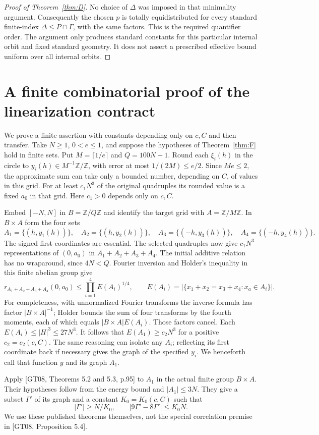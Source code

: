 \documentclass[11pt]{article}
\newcommand{\Z}{\mathbb Z}
\begin{document}
\begin{proof}[Proof of Theorem~\ref{thm:D}]
No choice of $\Delta$ was imposed in that minimality argument. Consequently
the chosen $p$ is totally equidistributed for every standard finite-index
$\Delta\leq P\cap\Gamma$, with the same factors. This is the required
quantifier order. The argument only produces standard constants for this
particular internal orbit and fixed standard geometry. It does not assert
a prescribed effective bound uniform over all internal orbits.
\end{proof}

\section{A finite combinatorial proof of the linearization contract}
We prove a finite assertion with constants depending only on $c,C$ and then
transfer. Take $N\geq1$, $0<e\leq1$, and suppose the hypotheses of
Theorem~\ref{thm:F} hold in finite sets. Put $M=\lceil1/e\rceil$ and
$Q=100N+1$. Round each $\xi_i(h)$ in the circle to $y_i(h)\in M^{-1}\Z/\Z$,
with error at most $1/(2M)\leq e/2$. Since $Me\leq2$, the approximate sum
can take only a bounded number, depending on $C$, of values in this grid.
For at least $c_1N^3$ of the original quadruples its rounded value is a
fixed $a_0$ in that grid. Here $c_1>0$ depends only on $c,C$.

Embed $[-N,N]$ in $B=\Z/Q\Z$ and identify the target grid with $A=\Z/M\Z$.
In $B\times A$ form the four sets
\[
 A_1=\{(h,y_1(h))\},\quad A_2=\{(h,y_2(h))\},\quad
 A_3=\{(-h,y_3(h))\},\quad A_4=\{(-h,y_4(h))\}.             \tag{F1}
\]
The signed first coordinates are essential. The selected quadruples now
give $c_1N^3$ representations of $(0,a_0)$ in $A_1+A_2+A_3+A_4$.
The initial additive relation has no wraparound, since $4N<Q$.
Fourier inversion and Holder's inequality in this finite abelian group give
\[
 r_{A_1+A_2+A_3+A_4}(0,a_0)
          \leq\prod_{i=1}^4 E(A_i)^{1/4},\qquad
 E(A_i)=|\{x_1+x_2=x_3+x_4:x_a\in A_i\}|.
\]
For completeness, with unnormalized Fourier transforms the inverse formula
has factor $|B\times A|^{-1}$; Holder bounds the sum of four transforms
by the fourth moments, each of which equals $|B\times A|E(A_i)$.
Those factors cancel. Each $E(A_i)\leq |H|^3\leq27N^3$.
It follows that $E(A_1)\geq c_2N^3$ for a positive $c_2=c_2(c,C)$.
The same reasoning can isolate any $A_i$; reflecting its first coordinate
back if necessary gives the graph of the specified $y_i$.
We henceforth call that function $y$ and its graph $A_1$.

Apply [GT08, Theorems 5.2 and 5.3, p.95] to $A_1$ in the actual finite
group $B\times A$. Their hypotheses follow from the energy bound and
$|A_1|\leq3N$. They give a subset $\Gamma'$ of its graph and a constant
$K_0=K_0(c,C)$ such that
\[
            |\Gamma'|\geq N/K_0,
            \qquad |9\Gamma'-8\Gamma'|\leq K_0N.             \tag{F2}
\]
We use these published theorems themselves, not the special correlation
premise in [GT08, Proposition 5.4].
\end{document}
